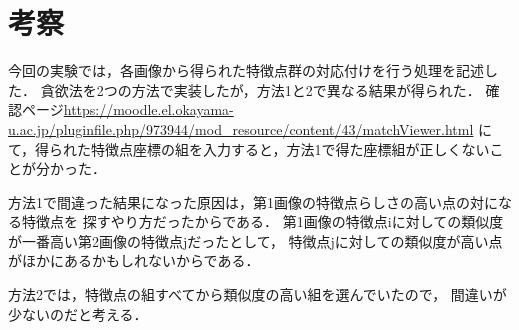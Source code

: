 \documentclass[11pt]{jarticle}
\begin{document}
\section{考察}

今回の実験では，各画像から得られた特徴点群の対応付けを行う処理を記述した．
貪欲法を2つの方法で実装したが，方法1と2で異なる結果が得られた．
確認ページ\url{https://moodle.el.okayama-u.ac.jp/pluginfile.php/973944/mod_resource/content/43/matchViewer.html}
にて，得られた特徴点座標の組を入力すると，方法1で得た座標組が正しくないことが分かった．

方法1で間違った結果になった原因は，第1画像の特徴点らしさの高い点の対になる特徴点を
探すやり方だったからである．
第1画像の特徴点iに対しての類似度が一番高い第2画像の特徴点jだったとして，
特徴点jに対しての類似度が高い点がほかにあるかもしれないからである．

方法2では，特徴点の組すべてから類似度の高い組を選んでいたので，
間違いが少ないのだと考える．
\end{document}
